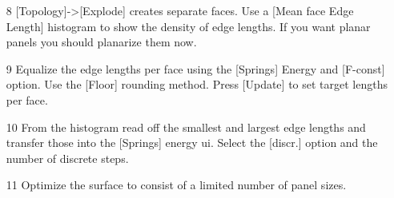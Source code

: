 \documentclass[Thesis.tex]{subfiles}
\begin{document}
\begin{itemize}
\item[8] [Topology]->[Explode] creates separate faces. Use a [Mean face Edge Length] histogram to show the density of edge lengths. If you want planar panels you should planarize them now. \\
\item[9] Equalize the edge lengths per face using the [Springs] Energy and [F-const] option. Use the [Floor] rounding method. Press [Update] to set target lengths per face.\\
\item[10] From the histogram read off the smallest and largest edge lengths and transfer those into the [Springs] energy ui. Select the [discr.] option and the number of discrete steps.
\item[11] Optimize the surface to consist of a limited number of panel sizes.\\
\end{itemize}
\end{document}
